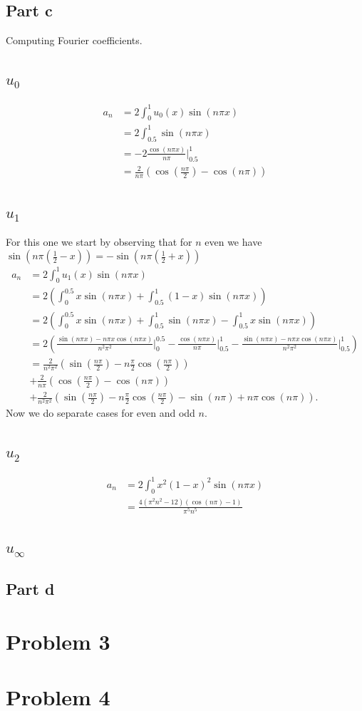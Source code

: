 \documentclass{article}
\begin{document}
\subsection{Part c}
Computing Fourier coefficients.
\subsection{$u_0$}
\begin{align*}
	a_n&=2\int_0^1 u_0(x)\sin(n\pi x)\\
	  &=2\int_{0.5}^1\sin(n\pi x)\\
	  &= -2\frac{\cos(n\pi x)}{n\pi}\Big|_{0.5}^1\\
	  &= \frac{2}{n\pi}\left(\cos\left(\frac{n\pi}{2}\right)-\cos(n\pi)\right)
\end{align*}
\subsection{$u_1$}
For this one we start by observing that for $n$ even we have $\sin\left(n\pi \left(\frac{1}{2}-x\right)\right)=-\sin\left(n\pi \left(\frac{1}{2}+x\right)\right)$
\begin{align*}
	a_n&=2\int_0^1 u_1(x)\sin(n\pi x)\\
	  &=2\left(\int_0^{0.5}x\sin(n\pi x)+\int_{0.5}^1(1-x)\sin(n\pi x)\right)\\
	  &=2\left(\int_0^{0.5}x\sin(n\pi x)+\int_{0.5}^1\sin(n\pi x)-\int_{0.5}^1x\sin(n\pi x)\right)\\
	  &=2\left(\frac{\sin(n\pi x)-n\pi x\cos(n\pi x)}{n^2\pi^2}\Big|_0^{0.5}
	  -\frac{\cos(n\pi x)}{n\pi}\Big|_{0.5}^1
	  -\frac{\sin(n\pi x)-n\pi x\cos(n\pi x)}{n^2\pi^2}\Big|_{0.5}^1\right)\\
	  &=\frac{2}{n^2\pi^2}\left(\sin\left(\frac{n\pi}{2}\right)-n\frac{\pi}{2}\cos\left(\frac{n\pi}{2}\right)\right)\\
	  &+\frac{2}{n\pi}\left(\cos\left(\frac{n\pi}{2}\right)-\cos(n\pi)\right)\\
	  &+\frac{2}{n^2\pi^2}\left(\sin\left(\frac{n\pi}{2}\right)-n\frac{\pi}{2}\cos\left(\frac{n\pi}{2}\right)-\sin(n\pi)+n\pi\cos(n\pi)\right).
\end{align*}
Now we do separate cases for even and odd $n$.
\subsection{$u_2$}
\begin{align*}
	a_n&=2\int_0^1 x^2(1-x)^2\sin(n\pi x)\\
	   &=\frac{4(\pi^2 n^2-12)(\cos(n\pi)-1)}{\pi^5n^5}
\end{align*}
\subsection{$u_\infty$}
\subsection{Part d}
\section{Problem 3}
\section{Problem 4}
\end{document}
